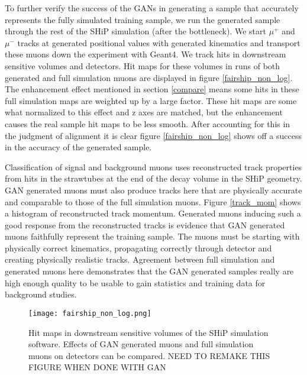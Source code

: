 \documentclass{article}
\begin{document}
    To further verify the success of the GANs in generating a sample that accurately represents the fully simulated training sample, we run the generated sample through the rest of the SHiP simulation (after the bottleneck). We start $\mu^+$ and $\mu^-$ tracks at generated positional values with generated kinematics and transport these muons down the experiment with Geant4. We track hits in downstream sensitive volumes and detectors. Hit maps for these volumes in runs of both generated and full simulation muons are displayed in figure \ref{fairship_non_log}. The enhancement effect mentioned in section \ref{compare} means some hits in these full simulation maps are weighted up by a large factor. These hit maps are some what normalized to this effect and z axes are matched, but the enhancement causes the real sample hit maps to be less smooth. After accounting for this in the judgment of alignment it is clear figure \ref{fairship_non_log} shows off a success in the accuracy of the generated sample. 
    
    Classification of signal and background muons uses reconstructed track properties from hits in the strawtubes at the end of the decay volume in the SHiP geometry. GAN generated muons must also produce tracks here that are physically accurate and comparable to those of the full simulation muons. Figure \ref{track_mom} shows a histogram of reconstructed track momentum. Generated muons inducing such a good response from the reconstructed tracks is evidence that GAN generated muons faithfully represent the training sample. The muons must be starting with physically correct kinematics, propagating correctly through detector and creating physically realistic tracks. Agreement between full simulation and generated muons here demonstrates that the GAN generated samples really are high enough quality to be usable to gain statistics and training data for background studies. 
    
    
    
    
            \begin{figure}[h!]
            \centering
            \texttt{[image: fairship\_non\_log.png]}
            \caption{Hit maps in downstream sensitive volumes of the SHiP simulation software. Effects of GAN generated muons and full simulation muons on detectors can be compared. NEED TO REMAKE THIS FIGURE WHEN DONE WITH GAN}
            \end{figure}\label{fairship_non_log}
            
\end{document}
